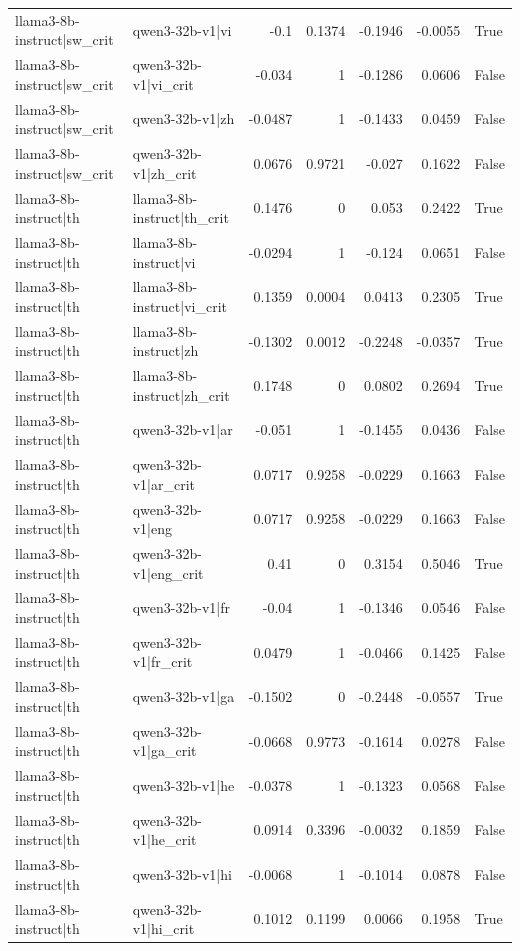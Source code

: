 \begin{table}
\begin{tabular}{l l r r r r l}
llama3-8b-instruct|sw_crit & qwen3-32b-v1|vi & -0.1 & 0.1374 & -0.1946 & -0.0055 & True \\
llama3-8b-instruct|sw_crit & qwen3-32b-v1|vi_crit & -0.034 & 1 & -0.1286 & 0.0606 & False \\
llama3-8b-instruct|sw_crit & qwen3-32b-v1|zh & -0.0487 & 1 & -0.1433 & 0.0459 & False \\
llama3-8b-instruct|sw_crit & qwen3-32b-v1|zh_crit & 0.0676 & 0.9721 & -0.027 & 0.1622 & False \\
llama3-8b-instruct|th & llama3-8b-instruct|th_crit & 0.1476 & 0 & 0.053 & 0.2422 & True \\
llama3-8b-instruct|th & llama3-8b-instruct|vi & -0.0294 & 1 & -0.124 & 0.0651 & False \\
llama3-8b-instruct|th & llama3-8b-instruct|vi_crit & 0.1359 & 0.0004 & 0.0413 & 0.2305 & True \\
llama3-8b-instruct|th & llama3-8b-instruct|zh & -0.1302 & 0.0012 & -0.2248 & -0.0357 & True \\
llama3-8b-instruct|th & llama3-8b-instruct|zh_crit & 0.1748 & 0 & 0.0802 & 0.2694 & True \\
llama3-8b-instruct|th & qwen3-32b-v1|ar & -0.051 & 1 & -0.1455 & 0.0436 & False \\
llama3-8b-instruct|th & qwen3-32b-v1|ar_crit & 0.0717 & 0.9258 & -0.0229 & 0.1663 & False \\
llama3-8b-instruct|th & qwen3-32b-v1|eng & 0.0717 & 0.9258 & -0.0229 & 0.1663 & False \\
llama3-8b-instruct|th & qwen3-32b-v1|eng_crit & 0.41 & 0 & 0.3154 & 0.5046 & True \\
llama3-8b-instruct|th & qwen3-32b-v1|fr & -0.04 & 1 & -0.1346 & 0.0546 & False \\
llama3-8b-instruct|th & qwen3-32b-v1|fr_crit & 0.0479 & 1 & -0.0466 & 0.1425 & False \\
llama3-8b-instruct|th & qwen3-32b-v1|ga & -0.1502 & 0 & -0.2448 & -0.0557 & True \\
llama3-8b-instruct|th & qwen3-32b-v1|ga_crit & -0.0668 & 0.9773 & -0.1614 & 0.0278 & False \\
llama3-8b-instruct|th & qwen3-32b-v1|he & -0.0378 & 1 & -0.1323 & 0.0568 & False \\
llama3-8b-instruct|th & qwen3-32b-v1|he_crit & 0.0914 & 0.3396 & -0.0032 & 0.1859 & False \\
llama3-8b-instruct|th & qwen3-32b-v1|hi & -0.0068 & 1 & -0.1014 & 0.0878 & False \\
llama3-8b-instruct|th & qwen3-32b-v1|hi_crit & 0.1012 & 0.1199 & 0.0066 & 0.1958 & True \\

\end{tabular}
\end{table}
